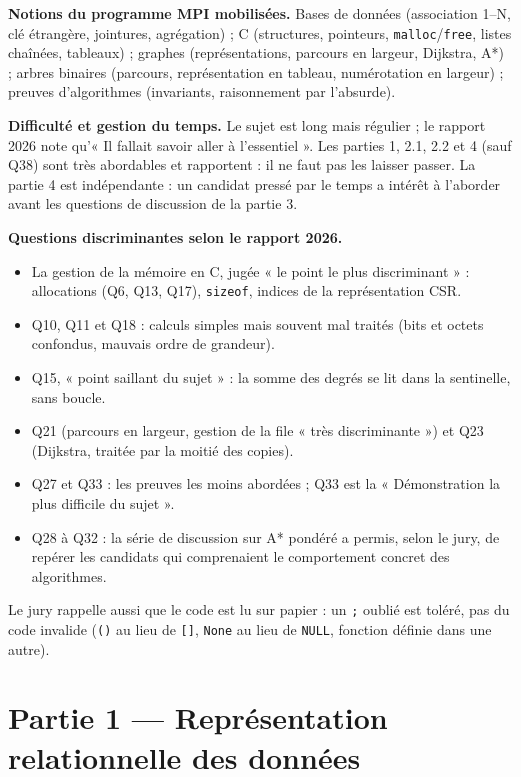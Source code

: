 \documentclass[11pt,a4paper]{article}
\providecommand{\tightlist}{\setlength{\itemsep}{0pt}\setlength{\parskip}{0pt}}
\begin{document}
\textbf{Notions du programme MPI mobilisées.} Bases de données (association 1--N, clé étrangère, jointures, agrégation) ; C (structures, pointeurs, \texttt{malloc}/\texttt{free}, listes chaînées, tableaux) ; graphes (représentations, parcours en largeur, Dijkstra, A*) ; arbres binaires (parcours, représentation en tableau, numérotation en largeur) ; preuves d'algorithmes (invariants, raisonnement par l'absurde).

\textbf{Difficulté et gestion du temps.} Le sujet est long mais régulier ; le rapport 2026 note qu'« Il fallait savoir aller à l'essentiel ». Les parties 1, 2.1, 2.2 et 4 (sauf Q38) sont très abordables et rapportent : il ne faut pas les laisser passer. La partie 4 est indépendante : un candidat pressé par le temps a intérêt à l'aborder avant les questions de discussion de la partie 3.

\textbf{Questions discriminantes selon le rapport 2026.}

\begin{itemize}
\tightlist
\item
  La gestion de la mémoire en C, jugée « le point le plus discriminant » : allocations (Q6, Q13, Q17), \texttt{sizeof}, indices de la représentation CSR.
\item
  Q10, Q11 et Q18 : calculs simples mais souvent mal traités (bits et octets confondus, mauvais ordre de grandeur).
\item
  Q15, « point saillant du sujet » : la somme des degrés se lit dans la sentinelle, sans boucle.
\item
  Q21 (parcours en largeur, gestion de la file « très discriminante ») et Q23 (Dijkstra, traitée par la moitié des copies).
\item
  Q27 et Q33 : les preuves les moins abordées ; Q33 est la « Démonstration la plus difficile du sujet ».
\item
  Q28 à Q32 : la série de discussion sur A* pondéré a permis, selon le jury, de repérer les candidats qui comprenaient le comportement concret des algorithmes.
\end{itemize}

Le jury rappelle aussi que le code est lu sur papier : un \texttt{;} oublié est toléré, pas du code invalide (\texttt{()} au lieu de \texttt{{[}{]}}, \texttt{None} au lieu de \texttt{NULL}, fonction définie dans une autre).

\hypertarget{partie-1-repruxe9sentation-relationnelle-des-donnuxe9es}{%
\section{Partie 1 --- Représentation relationnelle des données}\label{partie-1-repruxe9sentation-relationnelle-des-donnuxe9es}}
\end{document}
